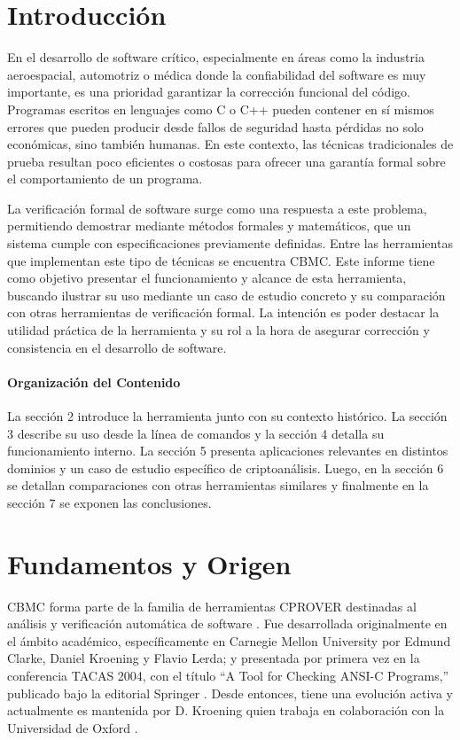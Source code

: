 \documentclass[runningheads]{llncs}
\begin{document}
%
\section{Introducción}
En el desarrollo de software crítico, especialmente en áreas como la industria aeroespacial, automotriz o médica donde la confiabilidad del software es muy importante,
es una prioridad garantizar la corrección funcional del código.
Programas escritos en lenguajes como C o C++ pueden contener en sí mismos errores que pueden producir desde fallos de seguridad hasta pérdidas no solo económicas,
sino también humanas.
En este contexto, las técnicas tradicionales de prueba resultan poco eficientes o costosas para ofrecer una garantía formal sobre el comportamiento de un programa.

La verificación formal de software surge como una respuesta a este problema, permitiendo demostrar mediante métodos formales y matemáticos,
que un sistema cumple con especificaciones previamente definidas.
Entre las herramientas que implementan este tipo de técnicas se encuentra CBMC.
Este informe tiene como objetivo presentar el funcionamiento y alcance de esta herramienta, buscando ilustrar su uso mediante un caso de estudio concreto y su comparación con otras
herramientas de verificación formal.
La intención es poder destacar la utilidad práctica de la herramienta y su rol a la hora de asegurar corrección y consistencia en el desarrollo de software.

\paragraph{Organización del Contenido}
La sección 2 introduce la herramienta junto con su contexto histórico.
La sección 3 describe su uso desde la línea de comandos y la sección 4 detalla su funcionamiento interno.
La sección 5 presenta aplicaciones relevantes en distintos dominios y un caso de estudio específico de criptoanálisis.
Luego, en la sección 6 se detallan comparaciones con otras herramientas similares y finalmente en la sección 7 se exponen las conclusiones.

%
\section{Fundamentos y Origen}
CBMC forma parte de la familia de herramientas CPROVER destinadas al análisis y verificación automática de software \cite{cbmc-paper}.
Fue desarrollada originalmente en el ámbito académico, específicamente en Carnegie Mellon University por Edmund Clarke, Daniel Kroening y Flavio Lerda; 
y presentada por primera vez en la conferencia TACAS 2004, con el título “A Tool for Checking ANSI-C Programs,” publicado bajo la editorial Springer \cite{tacas-2004}.
Desde entonces, tiene una evolución activa y actualmente es mantenida por D. Kroening quien trabaja en colaboración con la Universidad de Oxford \cite{cbmc-paper}.
\end{document}
